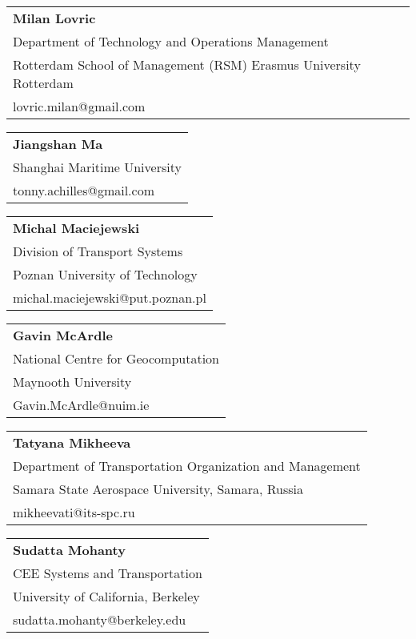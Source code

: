 \begin{tabular}[width=0.48\textwidth]{@{}l}
\textbf{Milan Lovric} \\
Department of Technology and Operations Management \\
Rotterdam School of Management (RSM) Erasmus University Rotterdam \\
lovric.milan@gmail.com  \\
\end{tabular}

\begin{tabular}[width=0.48\textwidth]{@{}l}
\textbf{Jiangshan Ma} \\
Shanghai Maritime University\\
tonny.achilles@gmail.com\\
\end{tabular}

\begin{tabular}[width=0.48\textwidth]{@{}l}
\textbf{Michal Maciejewski} \\
Division of Transport Systems \\
Poznan University of Technology \\
michal.maciejewski@put.poznan.pl \\
\end{tabular}

\begin{tabular}[width=0.48\textwidth]{@{}l}
\textbf{Gavin McArdle} \\
National Centre for Geocomputation \\
Maynooth University \\
Gavin.McArdle@nuim.ie \\
\end{tabular}

\begin{tabular}[width=0.48\textwidth]{@{}l}
\textbf{Tatyana Mikheeva} \\
Department of Transportation Organization and Management \\
Samara State Aerospace University, Samara, Russia \\
mikheevati@its-spc.ru \\
\end{tabular}

\begin{tabular}[width=0.48\textwidth]{@{}l}
\textbf{Sudatta Mohanty} \\
CEE Systems and Transportation \\
University of California, Berkeley \\
sudatta.mohanty@berkeley.edu \\
\end{tabular}

